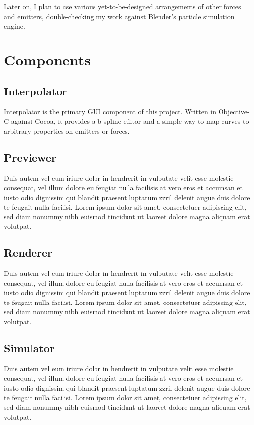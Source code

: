 \documentclass{acmsiggraph}
\begin{document}
Later on, I plan to use various yet-to-be-designed arrangements of other forces and emitters, double-checking my work against Blender's particle simulation engine.

\section{Components}

\subsection{Interpolator}

Interpolator is the primary GUI component of this project. Written in Objective-C against Cocoa, it provides a b-spline editor and a simple way to map curves to arbitrary properties on emitters or forces.

\subsection{Previewer}

Duis autem vel eum iriure dolor in hendrerit in vulputate velit esse
molestie consequat, vel illum dolore eu feugiat nulla facilisis at
vero eros et accumsan et iusto odio dignissim qui blandit praesent
luptatum zzril delenit augue duis dolore te feugait nulla
facilisi. Lorem ipsum dolor sit amet, consectetuer adipiscing elit,
sed diam nonummy nibh euismod tincidunt ut laoreet dolore magna
aliquam erat volutpat.

\subsection{Renderer}

Duis autem vel eum iriure dolor in hendrerit in vulputate velit esse
molestie consequat, vel illum dolore eu feugiat nulla facilisis at
vero eros et accumsan et iusto odio dignissim qui blandit praesent
luptatum zzril delenit augue duis dolore te feugait nulla
facilisi. Lorem ipsum dolor sit amet, consectetuer adipiscing elit,
sed diam nonummy nibh euismod tincidunt ut laoreet dolore magna
aliquam erat volutpat.

\subsection{Simulator}

Duis autem vel eum iriure dolor in hendrerit in vulputate velit esse
molestie consequat, vel illum dolore eu feugiat nulla facilisis at
vero eros et accumsan et iusto odio dignissim qui blandit praesent
luptatum zzril delenit augue duis dolore te feugait nulla
facilisi. Lorem ipsum dolor sit amet, consectetuer adipiscing elit,
sed diam nonummy nibh euismod tincidunt ut laoreet dolore magna
aliquam erat volutpat.
\end{document}

